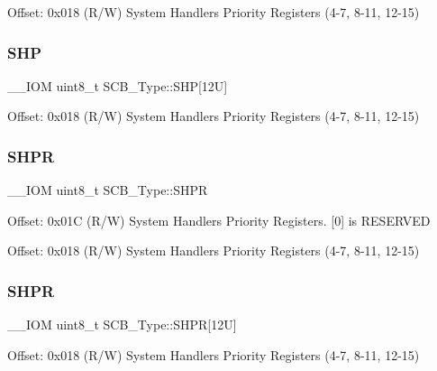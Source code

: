 Offset\+: 0x018 (R/W) System Handlers Priority Registers (4-\/7, 8-\/11, 12-\/15) \mbox{\label{struct_s_c_b___type_a9b05f74580fc93daa7fe2f0e1c9c5663}} 
\subsubsection{\texorpdfstring{SHP}{SHP}\hspace{0.1cm}{\footnotesize\ttfamily [2/2]}}
{\footnotesize\ttfamily \+\_\+\+\_\+\+I\+OM uint8\+\_\+t S\+C\+B\+\_\+\+Type\+::\+S\+HP\mbox{[}12\+U\mbox{]}}

Offset\+: 0x018 (R/W) System Handlers Priority Registers (4-\/7, 8-\/11, 12-\/15) \mbox{\label{struct_s_c_b___type_ac6259676cd7892a1b62f3fa7c0930780}} 
\subsubsection{\texorpdfstring{SHPR}{SHPR}\hspace{0.1cm}{\footnotesize\ttfamily [1/2]}}
{\footnotesize\ttfamily \+\_\+\+\_\+\+I\+OM uint8\+\_\+t S\+C\+B\+\_\+\+Type\+::\+S\+H\+PR}

Offset\+: 0x01C (R/W) System Handlers Priority Registers. \mbox{[}0\mbox{]} is R\+E\+S\+E\+R\+V\+ED

Offset\+: 0x018 (R/W) System Handlers Priority Registers (4-\/7, 8-\/11, 12-\/15) \mbox{\label{struct_s_c_b___type_afdab23abd301033bb318c7b188b377db}} 
\subsubsection{\texorpdfstring{SHPR}{SHPR}\hspace{0.1cm}{\footnotesize\ttfamily [2/2]}}
{\footnotesize\ttfamily \+\_\+\+\_\+\+I\+OM uint8\+\_\+t S\+C\+B\+\_\+\+Type\+::\+S\+H\+PR\mbox{[}12\+U\mbox{]}}

Offset\+: 0x018 (R/W) System Handlers Priority Registers (4-\/7, 8-\/11, 12-\/15) \mbox{\label{struct_s_c_b___type_ad70825dd0869b7ccd07fb2b8680fcdb6}} 
